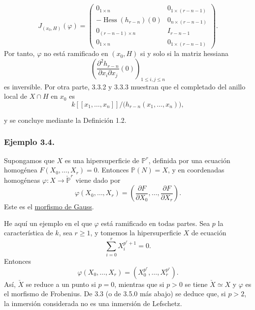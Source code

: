\pageoriginale

\begin{equation}\tag{3.3.15}
J_{(x_0,H)}(\varphi)=
\left(
\begin{array}{c|c}
0_{1\times n} & 0_{1\times(r-n-1)}\\ \hline
-\operatorname{Hess}(h_{r-n})(0) & 0_{n\times(r-n-1)}\\ \hline
0_{(r-n-1)\times n} & I_{r-n-1}\\ \hline
0_{1\times n} & 0_{1\times(r-n-1)}
\end{array}
\right).
\end{equation}
Por tanto, $\varphi$ no está ramificado en $(x_0,H)$ si y solo si la
matriz hessiana
\[
\left(
\frac{\partial^2h_{r-n}}{\partial x_i\partial x_j}(0)
\right)_{1\leq i,j\leq n}
\]
es inversible. Por otra parte, 3.3.2 y 3.3.3 muestran que el completado
del anillo local de $X\cap H$ en $x_0$ es
\begin{equation}\tag{3.3.16}
k[[x_1,\ldots,x_n]]/
\bigl(h_{r-n}(x_1,\ldots,x_n)\bigr),
\end{equation}

\pageoriginale

y se concluye mediante la Definición 1.2.

\subsubsection*{Ejemplo 3.4.}
Supongamos que $X$ es una hipersuperficie de $\mathbb P^r$, definida
por una ecuación homogénea $F(X_0,\ldots,X_r)=0$. Entonces
$\mathbb P(N)=X$, y en coordenadas homogéneas
$\varphi:X\to\check{\mathbb P}^{r}$ viene dado por
\begin{equation}\tag{3.4.1}
\varphi(X_0,\ldots,X_r)=
\left(
\frac{\partial F}{\partial X_0},\ldots,
\frac{\partial F}{\partial X_r}
\right).
\end{equation}
Este es el \underline{morfismo de Gauss}.

He aquí un ejemplo en el que $\varphi$ está ramificado en todas partes.
Sea $p$ la característica de $k$, sea $r\geq1$, y tomemos la
hipersuperficie $X$ de ecuación
\begin{equation}\tag{3.4.2}
\sum_{i=0}^{r}X_i^{p^r+1}=0.
\end{equation}
Entonces
\begin{equation}\tag{3.4.3}
\varphi(X_0,\ldots,X_r)
=(X_0^{p^r},\ldots,X_r^{p^r}).
\end{equation}
Así, $\check X$ se reduce a un punto si $p=0$, mientras que si $p>0$
se tiene $\check X\simeq X$ y $\varphi$ es el morfismo de Frobenius.
De 3.3 (o de 3.5.0 más abajo) se deduce que, si $p>2$, la inmersión
considerada no es una inmersión de Lefschetz.

